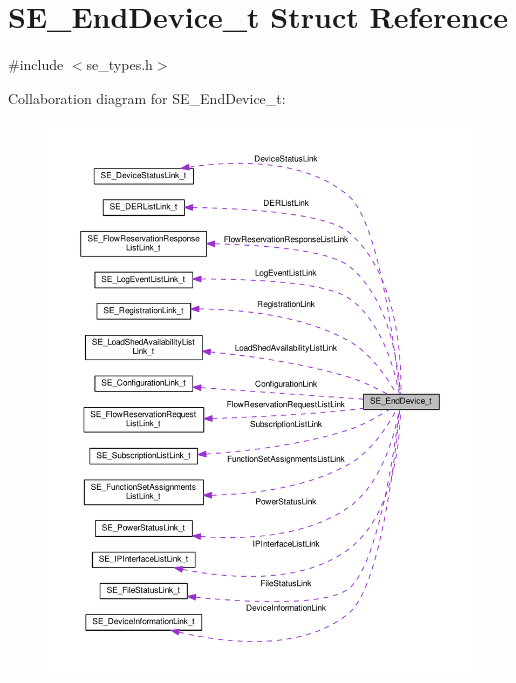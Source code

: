 \hypertarget{structSE__EndDevice__t}{}\section{S\+E\+\_\+\+End\+Device\+\_\+t Struct Reference}
\label{structSE__EndDevice__t}


{\ttfamily \#include $<$se\+\_\+types.\+h$>$}



Collaboration diagram for S\+E\+\_\+\+End\+Device\+\_\+t\+:\nopagebreak
\begin{figure}[H]
\begin{center}
\leavevmode
\includegraphics[width=350pt]{structSE__EndDevice__t__coll__graph}
\end{center}
\end{figure}

